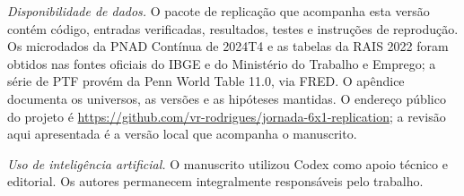 \documentclass[12pt]{article}
\begin{document}
\textit{Disponibilidade de dados.} O pacote de replicação que acompanha esta versão contém código, entradas verificadas, resultados, testes e instruções de reprodução. Os microdados da PNAD Contínua de 2024T4 e as tabelas da RAIS 2022 foram obtidos nas fontes oficiais do IBGE e do Ministério do Trabalho e Emprego; a série de PTF provém da Penn World Table 11.0, via FRED. O apêndice documenta os universos, as versões e as hipóteses mantidas. O endereço público do projeto é \url{https://github.com/vr-rodrigues/jornada-6x1-replication}; a revisão aqui apresentada é a versão local que acompanha o manuscrito.

\textit{Uso de intelig\^encia artificial.} O manuscrito utilizou Codex como apoio t\'ecnico e editorial. Os autores permanecem integralmente respons\'aveis pelo trabalho.
\end{document}
